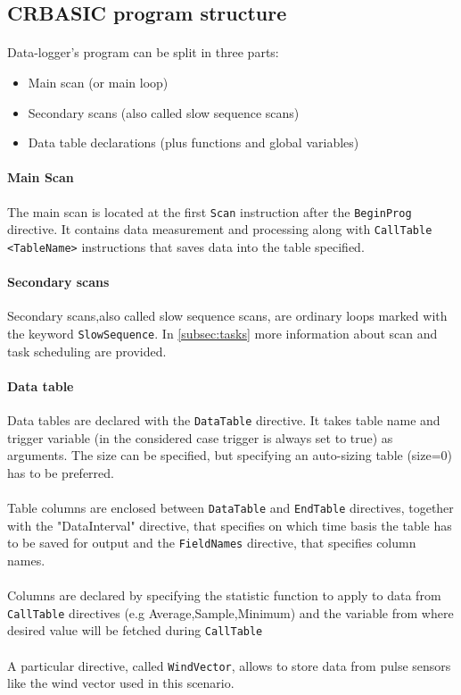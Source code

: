 \subsection{CRBASIC program structure}
\paragraph{}Data-logger's program can be split in three parts:
\begin{itemize}
	\item Main scan (or main loop)
	\item Secondary scans (also called slow sequence scans)
	\item Data table declarations (plus functions and global variables)
\end{itemize}
\paragraph{Main Scan}
The main scan is located at the first {\tt Scan} instruction after the {\tt BeginProg} directive.
It contains data measurement and processing along with {\tt CallTable <TableName>} instructions
that saves data into the table specified.
\paragraph{Secondary scans}
Secondary scans,also called slow sequence scans, 
are ordinary loops marked with the keyword {\tt SlowSequence}.
In \ref{subsec:tasks} more information about scan and task scheduling are provided.
\paragraph{Data table}
Data tables are declared with the {\tt DataTable} directive. It takes table name and
trigger variable (in the considered case trigger is always set to true) as arguments.
The size can be specified, but specifying an auto-sizing table (size=0) has to be preferred.
\paragraph{} Table columns are enclosed between {\tt DataTable} and {\tt EndTable} directives, together with the "DataInterval"
directive, that specifies on which time basis the table has to be saved for output
and the {\tt FieldNames} directive, that specifies column names.
\paragraph{}Columns are declared by specifying the statistic function 
to apply to data from {\tt CallTable} directives (e.g Average,Sample,Minimum)
and the variable from where desired value will be fetched during {\tt CallTable}
\paragraph{} A particular directive, called {\tt WindVector}, allows to store
data from pulse sensors like the wind vector used in this scenario.